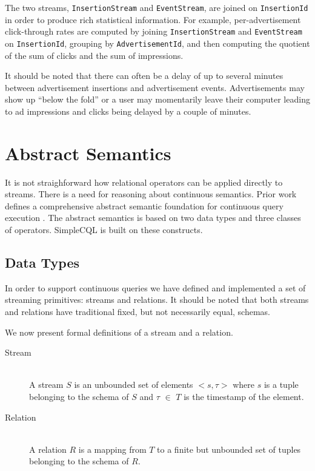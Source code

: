 \documentclass[a4paper, 10pt, conference]{IEEEconf}
\begin{document}
The two streams, \texttt{InsertionStream} and \texttt{EventStream}, are joined on \texttt{InsertionId} in order to produce rich statistical information.  For example, per-advertisement click-through rates are computed by joining \texttt{InsertionStream} and \texttt{EventStream} on \texttt{InsertionId}, grouping by \texttt{AdvertisementId}, and then computing the quotient of the sum of clicks and the sum of impressions.

It should be noted that there can often be a delay of up to several minutes between advertisement insertions and advertisement events.  Advertisements may show up ``below the fold'' or a user may momentarily leave their computer leading to ad impressions and clicks being delayed by a couple of minutes.

\section{Abstract Semantics}
It is not straighforward how relational operators can be applied directly to streams.  There is a need for reasoning about continuous semantics.  Prior work defines a comprehensive abstract semantic foundation for continuous query execution \cite{cql}.  The abstract semantics is based on two data types and three classes of operators.  SimpleCQL is built on these constructs.

\subsection{Data Types}
In order to support continuous queries we have defined and implemented a set of streaming primitives: streams and relations. It should be noted that both streams and relations have traditional fixed, but not necessarily equal, schemas.

We now present formal definitions of a stream and a relation.

\begin{description}
  \item[Stream] \hfill \\
  A stream $S$ is an unbounded set of elements $<s, \tau>$ where $s$ is a tuple belonging to the schema of $S$ and $\tau$ $\in$ $T$ is the timestamp of the element.
  
  \item[Relation] \hfill \\
  A relation $R$ is a mapping from $T$ to a finite but unbounded set of tuples belonging to the schema of $R$.
\end{description}
\end{document}
